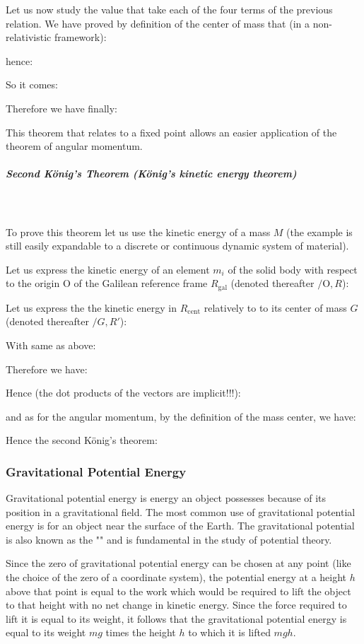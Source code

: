 	Let us now study the value that take each of the four terms of the previous relation. We have proved by definition of the center of mass that (in a non-relativistic framework):
	
	hence:
	
	So it comes:
	
	Therefore we have finally:
	
	This theorem that relates to a fixed point allows an easier application of the theorem of angular momentum.
	
	\subparagraph{Second König's Theorem (König's kinetic energy theorem)}\mbox{}\\\\
	To prove this theorem let us use the kinetic energy of a mass $M$ (the example is still easily expandable to a discrete or continuous dynamic system of material).

	Let us express the kinetic energy of an element $m_i$ of the solid body with respect to the origin O of the Galilean reference frame $R_\text{gal}$ (denoted thereafter $/\text{O},R$):
	
	Let us express the the kinetic energy in $R_\text{cent}$ relatively to to its center of mass $G$ (denoted thereafter $/G,R'$):
	
	With same as above:
	
	Therefore we have:
	
	Hence (the dot products of the vectors are implicit!!!):
	
	and as for the angular momentum, by the definition of the mass center, we have:
	
	Hence the second König's theorem:
	
	
	\pagebreak
	\subsubsection{Gravitational Potential Energy}
	Gravitational potential energy is energy an object possesses because of its position in a gravitational field. The most common use of gravitational potential energy is for an object near the surface of the Earth. The gravitational potential is also known as the "" and is fundamental in the study of potential theory.

	Since the zero of gravitational potential energy can be chosen at any point (like the choice of the zero of a coordinate system), the potential energy at a height $h$ above that point is equal to the work which would be required to lift the object to that height with no net change in kinetic energy. Since the force required to lift it is equal to its weight, it follows that the gravitational potential energy is equal to its weight $mg$ times the height $h$ to which it is lifted $mgh$.
	
